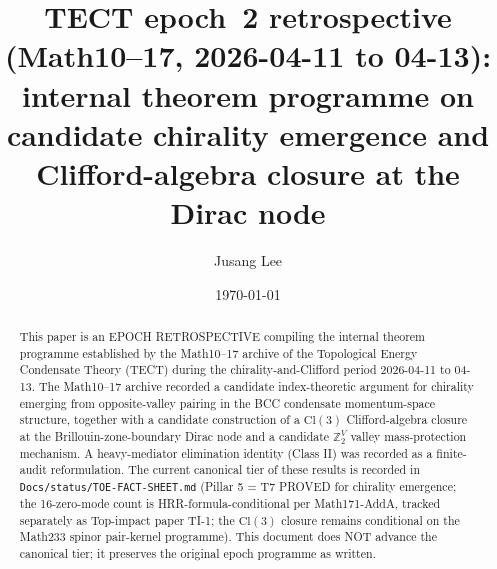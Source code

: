 



\title{TECT epoch~2 retrospective (Math10--17, 2026-04-11 to 04-13):
internal theorem programme on candidate chirality emergence and
Clifford-algebra closure at the Dirac node}

\author{Jusang Lee}

\date{\today}

\begin{abstract}
This paper is an EPOCH RETROSPECTIVE compiling the internal theorem
programme established by the Math10--17 archive of the Topological
Energy Condensate Theory (TECT) during the chirality-and-Clifford
period 2026-04-11 to 04-13. The Math10--17 archive recorded a
candidate index-theoretic argument for chirality emerging from
opposite-valley pairing in the BCC condensate momentum-space structure,
together with a candidate construction of a $\mathrm{Cl}(3)$
Clifford-algebra closure at the Brillouin-zone-boundary Dirac node and
a candidate $\mathbb{Z}_2^V$ valley mass-protection mechanism. A
heavy-mediator elimination identity (Class II) was recorded as a
finite-audit reformulation. The current canonical tier of these
results is recorded in
\texttt{Docs/status/TOE-FACT-SHEET.md} (Pillar 5 = T7 PROVED for
chirality emergence; the 16-zero-mode count is HRR-formula-conditional
per Math171-AddA, tracked separately as Top-impact paper TI-1; the
$\mathrm{Cl}(3)$ closure remains conditional on the Math233 spinor
pair-kernel programme). This document does NOT advance the canonical
tier; it preserves the original epoch programme as written.
\cite{Math10, Math11, Math12, Math13, Math14, Math15, Math16, Math17}
\end{abstract}

